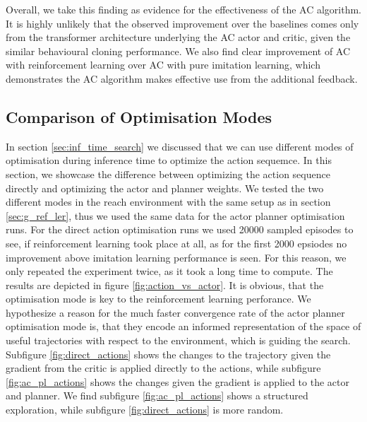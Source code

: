 Overall, we take this finding as evidence for the effectiveness of the AC algorithm. It is highly unlikely that the observed improvement
over the baselines comes only from the transformer architecture underlying the AC actor and critic, given the similar behavioural cloning performance. We also find clear improvement of AC with
reinforcement learning over AC with pure imitation learning, which demonstrates the AC algorithm makes effective use from the additional feedback. 

\subsection{Comparison of Optimisation Modes}
\label{ref:com_opt_modes}
In section \ref{sec:inf_time_search} we discussed that we can use different modes of optimisation during inference time to optimize the action sequemce. In this section, 
we showcase the difference between optimizing the action sequence directly and optimizing the actor and planner weights. We tested the two different 
modes in the reach environment with the same setup as in section \ref{sec:g_ref_ler}, thus we used the same data for the actor planner optimisation runs. For the direct 
action optimisation runs we used 20000 sampled episodes to see, if reinforcement learning took place at all, as for the first 2000 epsiodes no improvement above 
imitation learning performance is seen. For this reason, we only repeated the experiment twice, as it took a long time to compute. The results are depicted in figure 
\ref{fig:action_vs_actor}. It is obvious, that the optimisation mode is key to the reinforcement learning perforance. We hypothesize a reason for the much 
faster convergence rate of the actor planner optimisation mode is, that they encode an informed representation of the space of useful trajectories with 
respect to the environment, which is guiding the search. Subfigure \ref{fig:direct_actions} shows the changes to the trajectory given the gradient from the critic is applied 
directly to the actions, while subfigure \ref{fig:ac_pl_actions} shows the changes given the gradient is applied to the actor and planner. We find 
subfigure \ref{fig:ac_pl_actions} shows a structured exploration, while subfigure \ref{fig:direct_actions} is more random. 

